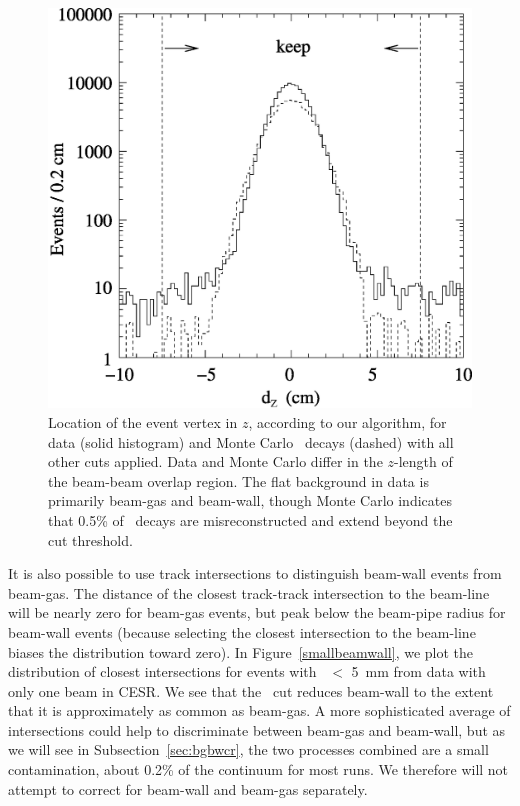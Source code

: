 \documentclass{cornell}
\begin{document}
\begin{figure}[p]
  \begin{center}
    \includegraphics[width=\linewidth]{dz}
  \end{center}
  \caption[Distribution of event vertex $z$ positions]{\label{dz}
  Location of the event vertex in $z$, according to our algorithm, for
  data (solid histogram) and Monte Carlo \ups\ decays (dashed) with
  all other cuts applied.  Data and Monte Carlo differ in the
  $z$-length of the beam-beam overlap region.  The flat background in
  data is primarily beam-gas and beam-wall, though Monte Carlo
  indicates that 0.5\% of \ups\ decays are misreconstructed and extend
  beyond the cut threshold.}
\end{figure}

It is also possible to use track intersections to distinguish
beam-wall events from beam-gas.  The distance of the closest
track-track intersection to the beam-line will be nearly zero for
beam-gas events, but peak below the beam-pipe radius for
beam-wall events (because selecting the closest intersection to the
beam-line biases the distribution toward zero).  In
Figure~\ref{smallbeamwall}, we plot the distribution of closest
intersections for events with \dxy\ $<$ 5~mm from data with only one
beam in CESR.  We see that the \dxy\ cut reduces beam-wall to the
extent that it is approximately as common as beam-gas.  A more
sophisticated average of intersections could help to discriminate
between beam-gas and beam-wall, but as we will see in
Subsection~\ref{sec:bgbwcr}, the two processes combined are a small
contamination, about 0.2\% of the continuum for most runs.  We
therefore will not attempt to correct for beam-wall and beam-gas
separately.
\end{document}
